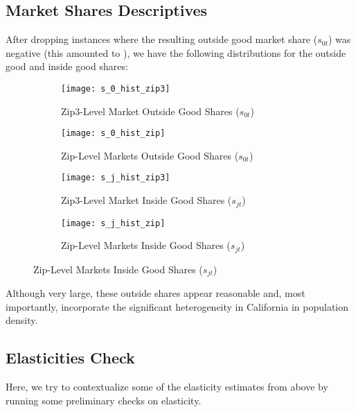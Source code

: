 \documentclass{article}
\begin{document}
\subsection{Market Shares Descriptives}

After dropping instances where the resulting outside good market share ($s_{0t}$) was negative (this amounted to ), we have the following distributions for the outside good and inside good shares:
\begin{figure}[H]
\centering
\begin{subfigure}[t]{0.4\textwidth}
\texttt{[image: s\_0\_hist\_zip3]}
\caption{Zip3-Level Market Outside Good Shares ($s_{0t}$)}
\end{subfigure}
\begin{subfigure}[t]{0.4\textwidth}
\texttt{[image: s\_0\_hist\_zip]}
\caption{Zip-Level Markets Outside Good Shares ($s_{0t}$)}
\end{subfigure}
\begin{subfigure}[t]{0.4\textwidth}
\texttt{[image: s\_j\_hist\_zip3]}
\caption{Zip3-Level Market Inside Good Shares ($s_{jt}$)}
\end{subfigure}
\begin{subfigure}[t]{0.4\textwidth}
\texttt{[image: s\_j\_hist\_zip]}
\caption{Zip-Level Markets Inside Good Shares ($s_{jt}$)}
\end{subfigure}
\end{figure}

Although very large, these outside shares appear reasonable and, most importantly, incorporate the significant heterogeneity in California in population density.

\subsection{Elasticities Check}

Here, we try to contextualize some of the elasticity estimates from above by running some preliminary checks on elasticity. 
\end{document}
